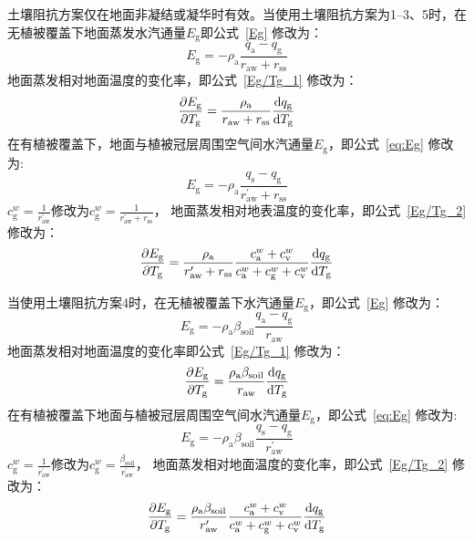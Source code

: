 土壤阻抗方案仅在地面非凝结或凝华时有效。当使用土壤阻抗方案为1--3、5时，在无植被覆盖下地面蒸发水汽通量\(E_{\mathrm{g}}\)即公式~\eqref{Eg} 修改为：
\begin{equation}
  E_{\mathrm{g}}=-\rho_{\mathrm{a}} \frac{q_{\mathrm{a}}-q_{\mathrm{g}}}{r_{\mathrm{a w}} + r_{\mathrm{s s}}}
\end{equation}
地面蒸发相对地面温度的变化率，即公式~\eqref{Eg/Tg_1} 修改为：
\begin{equation}
  \frac{\partial E_{\mathrm{g}}}{\partial T_{\mathrm{g}}}= \frac{\rho_{\mathrm{a}}}{r_{\mathrm{a w}} + r_{\mathrm{s s}}} \frac{{\rm d} q_{\mathrm{g}}}{{\rm d} T_{\mathrm{g}}}
\end{equation}
在有植被覆盖下，地面与植被冠层周围空气间水汽通量\(E_{\mathrm{g}}\)，即公式~\eqref{eq:Eg} 修改为:
\begin{equation}
  E_{\mathrm{g}}=-\rho_{\mathrm{a}} \frac{q_{\mathrm{s}}-q_{\mathrm{g}}}{r_{\mathrm{a w}}^{\prime}+r_{\mathrm{ss}}}
\end{equation}
$c_{\mathrm {g}}^w=\frac{1}{r_{\mathrm{aw}}^\prime}$修改为$c_{\mathrm {g}}^w=\frac{1}{r_{\mathrm{aw}} ^\prime+r_{\mathrm{ss}}}$，
地面蒸发相对地表温度的变化率，即公式~\eqref{Eg/Tg_2} 修改为：
\begin{equation}
  \frac{\partial E_{\mathrm{g}}}{\partial T_{\mathrm{g}}}=
  \frac{\rho_{\mathrm{a}}}{r_{\mathrm{a w}}^{\prime} + r_{\mathrm{s s}}} \frac{c_{\mathrm{a}}^{w}+c_{\mathrm{v}}^{w}}{c_{\mathrm{a}}^{w}+c_{\mathrm{g}}^{w}+c_{\mathrm{v}}^{w}} \frac{{\rm d} q_{\mathrm{g}}}{{\rm d} T_{\mathrm{g}}}
\end{equation}

当使用土壤阻抗方案4时，在无植被覆盖下水汽通量\(E_{\mathrm{g}}\)，即公式~\eqref{Eg} 修改为：
\begin{equation}\label{Eg_modify}
  E_{\mathrm{g}}=-\rho_{\mathrm{a}}\beta_{\mathrm{soil}} \frac{q_{\mathrm{a}}-q_{\mathrm{g}}}{r_{\mathrm{a w}}}
\end{equation}
地面蒸发相对地面温度的变化率即公式~\eqref{Eg/Tg_1} 修改为：
\begin{equation}
  \frac{\partial E_{\mathrm{g}}}{\partial T_{\mathrm{g}}}= \frac{\rho_{\mathrm{a}} \beta_{\mathrm{soil}}}{r_{\mathrm{a w}} } \frac{{\rm d} q_{\mathrm{g}}}{{\rm d} T_{\mathrm{g}}}
\end{equation}
在有植被覆盖下地面与植被冠层周围空气间水汽通量\(E_{\mathrm{g}}\)，即公式~\eqref{eq:Eg} 修改为:
\begin{equation}
  E_{\mathrm{g}}=-\rho_{\mathrm{a}} \beta_{\mathrm{soil}} \frac{q_{\mathrm{s}}-q_{\mathrm{g}}}{r_{\mathrm{a w}}^{\prime}}
\end{equation}
$c_{\mathrm {g}}^w=\frac{1}{r_{\mathrm{aw}}^\prime}$修改为$c_{\mathrm {g}}^w=\frac{\beta_{\mathrm{soil}}}{r_{\mathrm{aw}}^\prime}$，
地面蒸发相对地面温度的变化率，即公式~\eqref{Eg/Tg_2} 修改为：
\begin{equation}
  \frac{\partial E_{\mathrm{g}}}{\partial T_{\mathrm{g}}}=
  \frac{\rho_{\mathrm{a}} \beta_{\mathrm{soil}}}{r_{\mathrm{a w}}^{\prime}} \frac{c_{\mathrm{a}}^{w}+c_{\mathrm{v}}^{w}}{c_{\mathrm{a}}^{w}+c_{\mathrm{g}}^{w}+c_{\mathrm{v}}^{w}} \frac{{\rm d} q_{\mathrm{g}}}{{\rm d} T_{\mathrm{g}}}
\end{equation}
